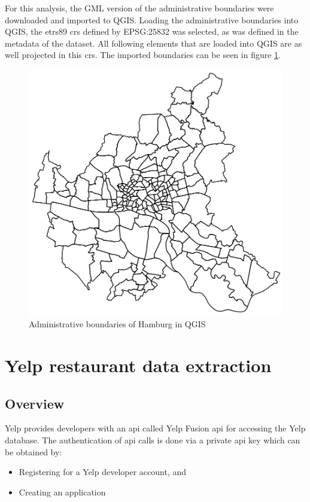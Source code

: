 \documentclass[a4paper, 11pt, oneside]{Thesis}  %
\begin{document}
For this analysis, the GML version of the administrative boundaries were downloaded and imported to QGIS. Loading the administrative boundaries into QGIS, the \ac{etrs89} \ac{crs} defined by EPSG:25832 was selected, as was defined in the metadata of the dataset. All following elements that are loaded into QGIS are as well projected in this \ac{crs}. The imported boundaries can be seen in figure \ref{fig:administrative_boundaries}.

\begin{figure}[h]
\includegraphics[scale=0.5]{Figures/Hamburg_Administrative_Boundaries.png}
\centering
\caption{Administrative boundaries of Hamburg in QGIS}
\label{fig:administrative_boundaries}
\end{figure}


\section{Yelp restaurant data extraction}

\subsection{Overview}

Yelp provides developers with an \ac{api} called Yelp Fusion \ac{api} for accessing the Yelp database. The authentication of \ac{api} calls is done via a private \ac{api} key which can be obtained by:
\begin{itemize}
\item Registering for a Yelp developer account, and
\item Creating an application
\end{itemize}
\end{document}
